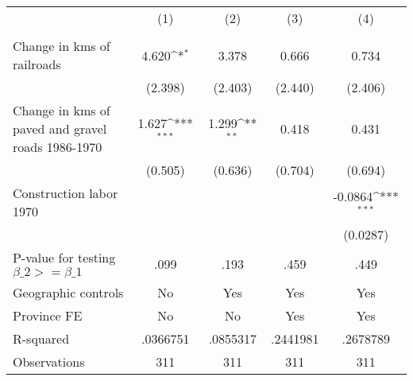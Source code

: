 {
\def\sym#1{\ifmmode^{#1}\else\(^{#1}\)\fi}
\begin{tabular}{l*{4}{c}}
\hline\hline
                &\multicolumn{1}{c}{(1)}&\multicolumn{1}{c}{(2)}&\multicolumn{1}{c}{(3)}&\multicolumn{1}{c}{(4)}\\
                &\multicolumn{1}{c}{}&\multicolumn{1}{c}{}&\multicolumn{1}{c}{}&\multicolumn{1}{c}{}\\
\hline
Change in kms of railroads&    4.620\sym{*}  &    3.378         &    0.666         &    0.734         \\
                &  (2.398)         &  (2.403)         &  (2.440)         &  (2.406)         \\
[1em]
Change in kms of paved and gravel roads 1986-1970&    1.627\sym{***}&    1.299\sym{**} &    0.418         &    0.431         \\
                &  (0.505)         &  (0.636)         &  (0.704)         &  (0.694)         \\
[1em]
Construction labor 1970&                  &                  &                  &  -0.0864\sym{***}\\
                &                  &                  &                  & (0.0287)         \\
\hline
P-value for testing $\beta\_{2} >= \beta\_{1}$&     .099         &     .193         &     .459         &     .449         \\
Geographic controls&       No         &      Yes         &      Yes         &      Yes         \\
Province FE     &       No         &       No         &      Yes         &      Yes         \\
R-squared       & .0366751         & .0855317         & .2441981         & .2678789         \\
Observations    &      311         &      311         &      311         &      311         \\
\hline\hline
\end{tabular}
}
